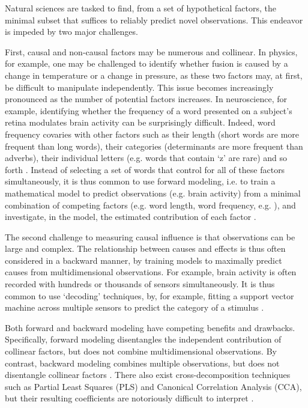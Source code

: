 Natural sciences are tasked to find, from a set of hypothetical factors, the minimal subset that suffices to reliably predict novel observations. This endeavor is impeded by two major challenges.

First, causal and non-causal factors may be numerous and collinear. In physics, for example, one may be challenged to identify whether fusion is caused by a change in temperature or a change in pressure, as these two factors may, at first, be difficult to manipulate independently. This issue becomes increasingly pronounced as the number of potential factors increases. In neuroscience, for example, identifying whether the frequency of a word presented on a subject's retina modulates brain activity can be surprisingly difficult. Indeed, word frequency covaries with other factors such as their length (short words are more frequent than long words), their categories (determinants are more frequent than adverbs), their individual letters (e.g. words that contain `z' are rare) and so forth \citep{kutas2011thirty,pegado2014timing}. Instead of selecting a set of words that control for all of these factors simultaneously, it is thus common to use forward modeling, i.e. to train a mathematical model to predict observations (e.g. brain activity) from a minimal combination of competing factors (e.g. word length, word frequency, e.g. \citep{huth2016natural}), and investigate, in the model, the estimated contribution of each factor \citep{friston1994statistical}.

The second challenge to measuring causal influence is that observations can be large and complex. The relationship between causes and effects is thus often considered in a backward manner, by training models to maximally predict causes from multidimensional observations. For example, brain activity is often recorded with hundreds or thousands of sensors simultaneously. It is thus common to use `decoding' techniques, by, for example, fitting a support vector machine across multiple sensors to predict the category of a stimulus \citep{cichy2014resolving,  kriegeskorte2008representational, norman2006beyond}.

Both forward and backward modeling have competing benefits and drawbacks. Specifically, forward modeling disentangles the independent contribution of collinear factors, but does not combine multidimensional observations. By contrast, backward modeling combines multiple observations, but does not disentangle collinear factors \cite{weichwald2015causal, hebart2018deconstructing, king2018encoding}. There also exist cross-decomposition techniques such as Partial Least Squares (PLS) and Canonical Correlation Analysis (CCA), but their resulting coefficients are notoriously difficult to interpret \citep{lebart1995statistique}.

